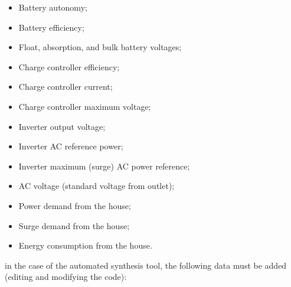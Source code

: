 \begin{itemize}
\item Battery autonomy;
\item Battery efficiency;
\item Float, absorption, and bulk battery voltages;
\item Charge controller efficiency;
\item Charge controller current;
\item Charge controller maximum voltage;
\item Inverter output voltage;
\item Inverter AC reference power;
\item Inverter maximum (surge) AC power reference;
\item AC voltage (standard voltage from outlet);
\item Power demand from the house;
\item Surge demand from the house;
\item Energy consumption from the house.
\end{itemize}

in the case of the automated synthesis tool, the following data must be added (editing and modifying the code):

